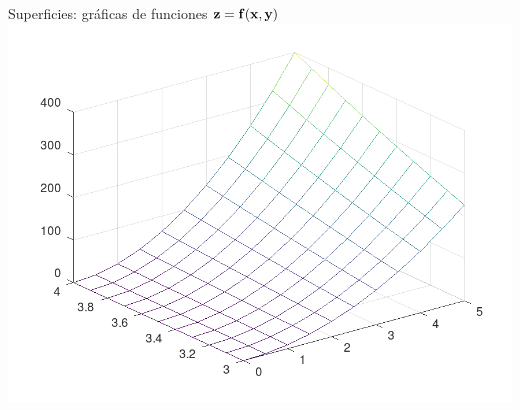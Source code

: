 \documentclass[8pt]{extarticle}
\begin{document}
\begin{multicols}{3}
\begin{exampleBlock}{Superficies: gr\'aficas de funciones $\bf{z=f(x,y)}$}
            \includegraphics[width=\textwidth]{plots/mesh.png}
        \end{exampleBlock}
        


    \end{multicols}


%
%
%
%
%
%
\end{document}
